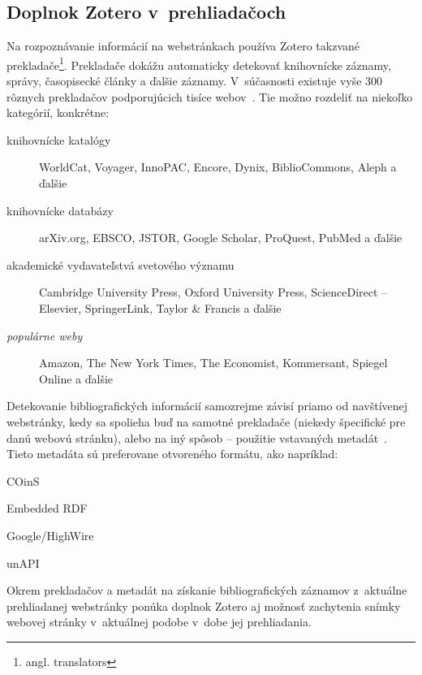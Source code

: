 \documentclass[
  color,
  table,
  nolof,
  oneside,
]{fithesis3}
\begin{document}
\subsection{Doplnok Zotero v~prehliadačoch}

Na rozpoznávanie informácií na webstránkach používa Zotero takzvané prekladače\footnote{angl. translators}. Prekladače dokážu automaticky detekovať knihovnícke záznamy, správy, časopisecké články a ďalšie záznamy. V~súčasnosti existuje vyše 300 rôznych prekladačov podporujúcich tisíce webov~\cite{ZoteroTranslators}. Tie možno rozdeliť na niekoľko kategórií, konkrétne:

\begin{description}
\item[knihovnícke katalógy] WorldCat, Voyager, InnoPAC, Encore, Dynix, BiblioCommons, Aleph a ďalšie
\item[knihovnícke databázy] arXiv.org, EBSCO, JSTOR, Google Scholar, ProQuest, PubMed a ďalšie
\item[akademické vydavateľstvá svetového významu] Cambridge University Press, Oxford University Press, ScienceDirect -- Elsevier, SpringerLink, Taylor \& Francis a ďalšie
\item[\emph{populárne weby}] Amazon, The New York Times, The Economist, Kommersant, Spiegel Online a ďalšie
\end{description}

Detekovanie bibliografických informácií samozrejme závisí priamo od navštívenej webstránky, kedy sa spolieha buď na samotné prekladače (niekedy špecifické pre danú webovú stránku), alebo na iný spôsob -- použitie vstavaných metadát~\cite{ZoteroDevMetadata}. Tieto metadáta sú preferovane otvoreného formátu, ako napríklad:

\begin{center}
\hspace*{\fill}
\begin{inparaitem}
\item COinS \hfill
\item Embedded RDF \hfill
\item Google/HighWire \hfill
\item unAPI
\end{inparaitem}
\hspace*{\fill}
\end{center}

Okrem prekladačov a metadát na získanie bibliografických záznamov z~aktuálne prehliadanej webstránky ponúka doplnok Zotero aj možnosť zachytenia snímky webovej stránky v~aktuálnej podobe v~dobe jej prehliadania.
\end{document}
